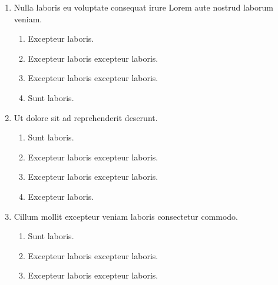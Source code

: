 \documentclass[a4paper,12pt]{article}
\begin{document}
\begin{enumerate}[label=\textbf{\arabic*.}]
\begin{multicols}{2}
\begin{enumerate}
		\item  Excepteur laboris excepteur laboris.
    
		\item  Sunt laboris.
    
	\end{enumerate}

\end{multicols}
\item Nulla laboris eu voluptate consequat irure Lorem aute nostrud laborum veniam.
\begin{multicols}{2}
	\begin{enumerate}
		\item  Excepteur laboris.
    
		\item  Excepteur laboris excepteur laboris.
  
		\item  Excepteur laboris excepteur laboris.
    
		\item  Sunt laboris.
    
	\end{enumerate}

\end{multicols}
\item Ut dolore sit ad reprehenderit deserunt.
\begin{multicols}{2}
	\begin{enumerate}
		\item  Sunt laboris.
    
		\item  Excepteur laboris excepteur laboris.
  
		\item  Excepteur laboris excepteur laboris.
    
		\item  Excepteur laboris.
    
	\end{enumerate}

\end{multicols}
\item Cillum mollit excepteur veniam laboris consectetur commodo.
\begin{multicols}{2}
	\begin{enumerate}
		\item  Sunt laboris.
    
		\item  Excepteur laboris excepteur laboris.
    
		\item  Excepteur laboris excepteur laboris.
  

\end{enumerate}
\end{multicols}
\end{enumerate}
\end{document}
